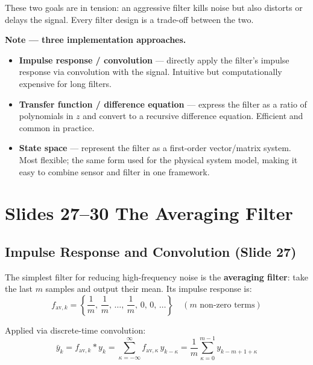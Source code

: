 \documentclass[12pt, a4paper]{article}
\begin{document}
These two goals are in tension: an aggressive filter kills noise but
also distorts or delays the signal. Every filter design is a trade-off
between the two.

\begin{notebox}
  \textbf{Note --- three implementation approaches.}
  \begin{itemize}[leftmargin=1.5em, topsep=2pt]
    \item \textbf{Impulse response / convolution} --- directly apply the
          filter's impulse response via convolution with the signal.
          Intuitive but computationally expensive for long filters.
    \item \textbf{Transfer function / difference equation} --- express the
          filter as a ratio of polynomials in $z$ and convert to a
          recursive difference equation. Efficient and common in practice.
    \item \textbf{State space} --- represent the filter as a first-order
          vector/matrix system. Most flexible; the same form used for
          the physical system model, making it easy to combine sensor
          and filter in one framework.
  \end{itemize}
\end{notebox}

\clearpage
\section*{Slides 27--30 \quad The Averaging Filter}

\subsection*{Impulse Response and Convolution (Slide 27)}

The simplest filter for reducing high-frequency noise is the
\textbf{averaging filter}: take the last $m$ samples and output their
mean. Its impulse response is:
\[
  f_{\mathrm{av},k} = \left\{\frac{1}{m},\, \frac{1}{m},\, \ldots,\,
  \frac{1}{m},\, 0,\, 0,\, \ldots\right\}
  \quad (m \text{ non-zero terms})
\]

Applied via discrete-time convolution:
\[
  \bar{y}_k = f_{\mathrm{av},k} * y_k
  = \sum_{\kappa=-\infty}^{\infty} f_{\mathrm{av},\kappa}\, y_{k-\kappa}
  = \frac{1}{m} \sum_{\kappa=0}^{m-1} y_{k-m+1+\kappa}
\]
\end{document}
